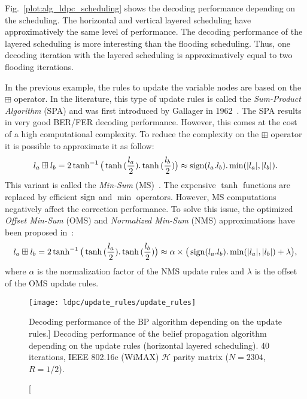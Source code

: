 Fig.~\ref{plot:alg_ldpc_scheduling} shows the decoding performance depending on
the scheduling. The horizontal and vertical layered scheduling have
approximatively the same level of performance. The decoding performance of the
layered scheduling is more interesting than the flooding scheduling. Thus, one
decoding iteration with the layered scheduling is approximatively equal to two
flooding iterations.

In the previous example, the rules to update the variable nodes are based on the
$\boxplus$ operator. In the literature, this type of update rules is called the
\emph{Sum-Product Algorithm} (SPA) and was first introduced by Gallager in
1962~\cite{Gallager1962}. The SPA results in very good BER/FER decoding
performance. However, this comes at the cost of a high computational complexity.
To reduce the complexity on the $\boxplus$ operator it is possible to
approximate it as follow:
\begin{equation}
\label{eq:alg_ldpc_ms}
l_a \boxplus l_b = 2\tanh^{-1}{\big(\tanh{(\frac{l_a}{2}).\tanh{(\frac{l_b}{2})}}\big)} \approx \operatorname*{sign}(l_a.l_b).\min(|l_a|, |l_b|).
\end{equation}
This variant is called the \emph{Min-Sum} (MS)~\cite{Fossorier1999}.
The expensive $\tanh$ functions are replaced by efficient $\operatorname*{sign}$ and $\min$
operators. However, MS computations negatively affect the correction
performance. To solve this issue, the optimized \emph{Offset Min-Sum} (OMS) and
\emph{Normalized Min-Sum} (NMS) approximations have been proposed
in~\cite{Chen2002}:
\begin{equation}
l_a \boxplus l_b = 2\tanh^{-1}{\big(\tanh{(\frac{l_a}{2}).\tanh{(\frac{l_b}{2})}}\big)} \approx \alpha \times \big( \operatorname*{sign}(l_a.l_b).\min(|l_a|, |l_b|) + \lambda \big),
\end{equation}
where $\alpha$ is the normalization factor of the NMS update rules and $\lambda$
is the offset of the OMS update rules.

\begin{figure}[htp]
  \centering
  \texttt{[image: ldpc/update\_rules/update\_rules]}
  \caption
    [Decoding performance of the BP algorithm depending on the update rules.]
    {Decoding performance of the belief propagation algorithm depending on the
     update rules (horizontal layered scheduling). 40 iterations, IEEE 802.16e
     (WiMAX) $\mathcal{H}$ parity matrix ($N=2304$, $R=1/2$).}
  \label{plot:alg_ldpc_update_rules}
\end{figure}

